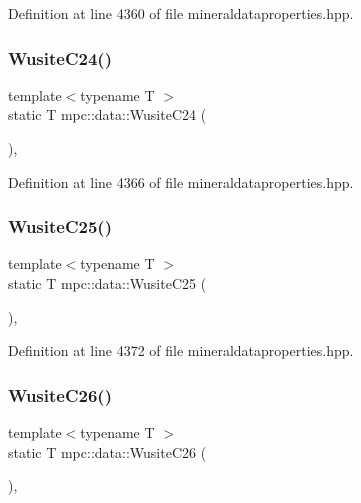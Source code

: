 Definition at line 4360 of file mineraldataproperties.\+hpp.

\mbox{\label{namespacempc_1_1data_ad3d5470f37f88a0e3c9a2e8886ea9dc1}} 
\subsubsection{\texorpdfstring{Wusite\+C24()}{WusiteC24()}}
{\footnotesize\ttfamily template$<$typename T $>$ \\
static T mpc\+::data\+::\+Wusite\+C24 (\begin{DoxyParamCaption}{ }\end{DoxyParamCaption})\hspace{0.3cm}{\ttfamily [inline]}, {\ttfamily [static]}}



Definition at line 4366 of file mineraldataproperties.\+hpp.

\mbox{\label{namespacempc_1_1data_af0ff5e88f772b787b841324f541eef2d}} 
\subsubsection{\texorpdfstring{Wusite\+C25()}{WusiteC25()}}
{\footnotesize\ttfamily template$<$typename T $>$ \\
static T mpc\+::data\+::\+Wusite\+C25 (\begin{DoxyParamCaption}{ }\end{DoxyParamCaption})\hspace{0.3cm}{\ttfamily [inline]}, {\ttfamily [static]}}



Definition at line 4372 of file mineraldataproperties.\+hpp.

\mbox{\label{namespacempc_1_1data_a5c237688382c9d0f58943a2ed26e595f}} 
\subsubsection{\texorpdfstring{Wusite\+C26()}{WusiteC26()}}
{\footnotesize\ttfamily template$<$typename T $>$ \\
static T mpc\+::data\+::\+Wusite\+C26 (\begin{DoxyParamCaption}{ }\end{DoxyParamCaption})\hspace{0.3cm}{\ttfamily [inline]}, {\ttfamily [static]}}



